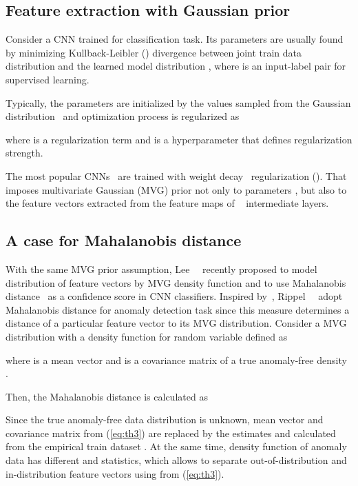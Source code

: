 \documentclass[10pt,twocolumn,letterpaper]{article}
\begin{document}
\subsection{Feature extraction with Gaussian prior}
\label{sec:gauss}
Consider a CNN  trained for classification task. Its parameters  are usually found by minimizing Kullback-Leibler () divergence between joint train data distribution  and the learned model distribution , where  is an input-label pair for supervised learning.

Typically, the parameters  are initialized by the values sampled from the Gaussian distribution~\cite{He_2015_ICCV} and optimization process is regularized as

where  is a regularization term and  is a hyperparameter that defines regularization strength.

The most popular CNNs~\cite{he, BMVC2016_87} are trained with  weight decay~\cite{NIPS1991_8eefcfdf} regularization (). That imposes multivariate Gaussian (MVG) prior not only to parameters , but also to the feature vectors  extracted from the feature maps of ~\cite{GoodBengCour16} intermediate layers.

\subsection{A case for Mahalanobis distance}
\label{sec:mahal}
With the same MVG prior assumption, Lee~\etal~\cite{NEURIPS2018_abdeb6f5} recently proposed to model distribution of feature vectors  by MVG density function and to use Mahalanobis distance~\cite{mahalanobis1936generalized} as a confidence score in CNN classifiers. Inspired by~\cite{NEURIPS2018_abdeb6f5}, Rippel~\etal~\cite{rippel2020modeling} adopt Mahalanobis distance for anomaly detection task since this measure determines a distance of a particular feature vector  to its MVG distribution. Consider a MVG distribution  with a density function  for random variable  defined as

where  is a mean vector and  is a covariance matrix of a true anomaly-free density .

Then, the Mahalanobis distance  is calculated as


Since the true anomaly-free data distribution is unknown, mean vector and covariance matrix from (\ref{eq:th3}) are replaced by the estimates  and  calculated from the empirical train dataset . At the same time, density function  of anomaly data has different  and  statistics, which allows to separate out-of-distribution and in-distribution feature vectors using  from (\ref{eq:th3}).
\end{document}
